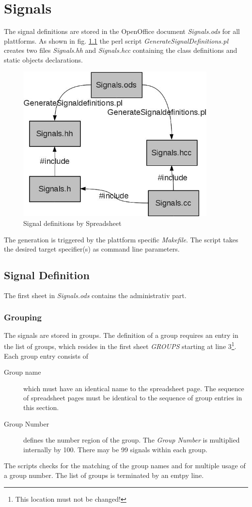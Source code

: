 \chapter{Signals}
\label{chapter_signals}

The signal definitions are stored in the OpenOffice document {\em Signals.ods}
for all plattforms.
As shown in fig. \ref{signals_ods} the perl script
{\em GenerateSignalDefinitions.pl} creates two files
{\em Signals.hh} and {\em Signals.hcc} containing the class definitions 
and static objects declarations. 

\begin{figure}[bpht]
\begin{center}
\includegraphics[width=10cm]{signals_ods.jpg}
\end{center}
\caption{Signal definitions by Spreadsheet}
\label{signals_ods}
\end{figure}

The generation is triggered by the plattform specific {\em Makefile}.
The script takes the desired target specifier(s) as command line
parameters.

\section{Signal Definition}
\label{sec_signal_definition}
The first sheet in {\em Signals.ods} contains the administrativ part.

\subsection{Grouping}
The signals are stored in groups. The definition of a group requires
an entry in the list of groups, which resides in the first sheet {\em GROUPS}
starting at line 3\footnote{This location must not be changed!}.
Each group entry consists of
\begin{description}
\item[Group name] which must have an identical name to the spreadsheet page.
   The sequence of spreadsheet pages must be identical to the sequence of
   group entries in this section.
\item[Group Number] defines the number region of the group.
    The {\em Group Number} is multiplied internally by 100.
    There may be 99 signals within each group.
\end{description}
The scripts checks for the matching of the group names and for multiple
usage of a group number.
The list of groups is terminated by an emtpy line.

